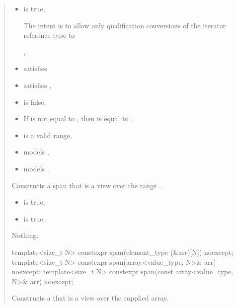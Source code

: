 \documentclass{wg21}
\begin{document}
\begin{quote}
\begin{addedblock}

\begin{itemdescr}
	 \pnum
	\constraints
	\begin{itemize}
		\item {} is true,
		\begin{note}The intent is to allow only qualification conversions of the iterator reference type to  \end{note},
		\item {} satisfies 
		\item {} satisfies ,
		\item {} is false.
	\end{itemize}

    \expects
    \begin{itemize}
    \item
    If  is not equal to ,
    then  is equal to ,
    \item {} is a valid range,
    \item {} models ,
    \item {} models .
    \end{itemize}

    \pnum
    \effects
    Constructs a span that is a view over the range .

    \pnum
    \ensures
    
    \begin{itemize}
    	\item {} is true,
    	\item {} is true.
    \end{itemize}
   
    \pnum
    \throws
    Nothing.


\end{itemdescr}
\end{addedblock}

\begin{itemdecl}
template<size_t N> constexpr span(element_type (&arr)[N]) noexcept;
template<size_t N> constexpr span(array<value_type, N>& arr) noexcept;
template<size_t N> constexpr span(const array<value_type, N>& arr) noexcept;
\end{itemdecl}
\begin{itemdescr}
    \pnum
    \effects
    Constructs a  that is a view over the supplied array.


\end{itemdescr}
\end{quote}
\end{document}
